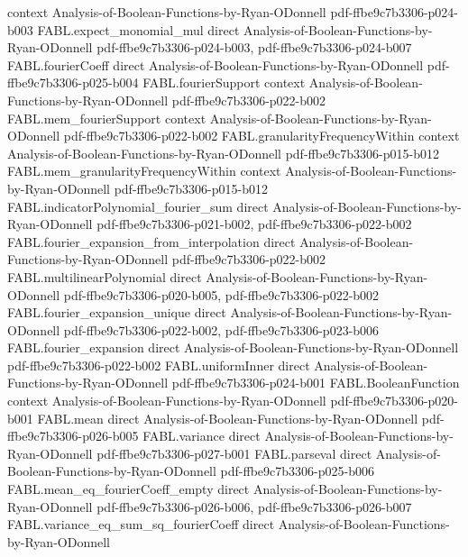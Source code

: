 \begin{theorem}
  {context}
  {Analysis-of-Boolean-Functions-by-Ryan-ODonnell}
  {pdf-ffbe9c7b3306-p024-b003}
\proofstep
  {FABL.expect_monomial_mul}
  {direct}
  {Analysis-of-Boolean-Functions-by-Ryan-ODonnell}
  {pdf-ffbe9c7b3306-p024-b003,
    pdf-ffbe9c7b3306-p024-b007}
\proofstep
  {FABL.fourierCoeff}
  {direct}
  {Analysis-of-Boolean-Functions-by-Ryan-ODonnell}
  {pdf-ffbe9c7b3306-p025-b004}
\proofstep
  {FABL.fourierSupport}
  {context}
  {Analysis-of-Boolean-Functions-by-Ryan-ODonnell}
  {pdf-ffbe9c7b3306-p022-b002}
\proofstep
  {FABL.mem_fourierSupport}
  {context}
  {Analysis-of-Boolean-Functions-by-Ryan-ODonnell}
  {pdf-ffbe9c7b3306-p022-b002}
\proofstep
  {FABL.granularityFrequencyWithin}
  {context}
  {Analysis-of-Boolean-Functions-by-Ryan-ODonnell}
  {pdf-ffbe9c7b3306-p015-b012}
\proofstep
  {FABL.mem_granularityFrequencyWithin}
  {context}
  {Analysis-of-Boolean-Functions-by-Ryan-ODonnell}
  {pdf-ffbe9c7b3306-p015-b012}
\proofstep
  {FABL.indicatorPolynomial_fourier_sum}
  {direct}
  {Analysis-of-Boolean-Functions-by-Ryan-ODonnell}
  {pdf-ffbe9c7b3306-p021-b002,
    pdf-ffbe9c7b3306-p022-b002}
\proofstep
  {FABL.fourier_expansion_from_interpolation}
  {direct}
  {Analysis-of-Boolean-Functions-by-Ryan-ODonnell}
  {pdf-ffbe9c7b3306-p022-b002}
\proofstep
  {FABL.multilinearPolynomial}
  {direct}
  {Analysis-of-Boolean-Functions-by-Ryan-ODonnell}
  {pdf-ffbe9c7b3306-p020-b005,
    pdf-ffbe9c7b3306-p022-b002}
\proofstep
  {FABL.fourier_expansion_unique}
  {direct}
  {Analysis-of-Boolean-Functions-by-Ryan-ODonnell}
  {pdf-ffbe9c7b3306-p022-b002,
    pdf-ffbe9c7b3306-p023-b006}
\proofstep
  {FABL.fourier_expansion}
  {direct}
  {Analysis-of-Boolean-Functions-by-Ryan-ODonnell}
  {pdf-ffbe9c7b3306-p022-b002}
\proofstep
  {FABL.uniformInner}
  {direct}
  {Analysis-of-Boolean-Functions-by-Ryan-ODonnell}
  {pdf-ffbe9c7b3306-p024-b001}
\proofstep
  {FABL.BooleanFunction}
  {context}
  {Analysis-of-Boolean-Functions-by-Ryan-ODonnell}
  {pdf-ffbe9c7b3306-p020-b001}
\proofstep
  {FABL.mean}
  {direct}
  {Analysis-of-Boolean-Functions-by-Ryan-ODonnell}
  {pdf-ffbe9c7b3306-p026-b005}
\proofstep
  {FABL.variance}
  {direct}
  {Analysis-of-Boolean-Functions-by-Ryan-ODonnell}
  {pdf-ffbe9c7b3306-p027-b001}
\proofstep
  {FABL.parseval}
  {direct}
  {Analysis-of-Boolean-Functions-by-Ryan-ODonnell}
  {pdf-ffbe9c7b3306-p025-b006}
\proofstep
  {FABL.mean_eq_fourierCoeff_empty}
  {direct}
  {Analysis-of-Boolean-Functions-by-Ryan-ODonnell}
  {pdf-ffbe9c7b3306-p026-b006,
    pdf-ffbe9c7b3306-p026-b007}
\proofstep
  {FABL.variance_eq_sum_sq_fourierCoeff}
  {direct}
  {Analysis-of-Boolean-Functions-by-Ryan-ODonnell}

\end{theorem}

